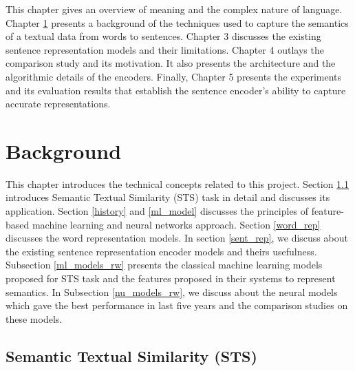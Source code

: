 \documentclass[12pt]{report} %
\begin{document}
	This chapter gives an overview of meaning and the complex nature of language. Chapter \ref{background} presents a background of the techniques used to capture the semantics of a textual data from words to sentences. Chapter 3 discusses the existing sentence representation models and their limitations. Chapter 4  outlays the comparison study and its motivation. It also presents the architecture and the algorithmic details of the encoders. Finally, Chapter 5 presents the experiments and its evaluation results that establish the sentence encoder's ability to capture accurate representations.
	
	

\chapter{Background}
\label{background}
This chapter introduces the technical concepts related to this project. Section \ref{sts} introduces Semantic Textual Similarity (STS) task in detail and discusses its application. Section \ref{history} and \ref{ml_model} discusses the
principles of feature-based machine learning and neural networks approach. Section \ref{word_rep} discusses the word representation models. In section \ref{sent_rep}, we discuss about the existing sentence representation encoder models and theirs usefulness. Subsection \ref{ml_models_rw} presents the classical machine learning models proposed for STS task and the features proposed in their systems to represent semantics.  In Subsection \ref{nu_models_rw}, we discuss about the neural models which gave the best performance in last five years and the comparison studies on these models.


\section{Semantic Textual Similarity (STS)}
\label{sts}
\end{document}
